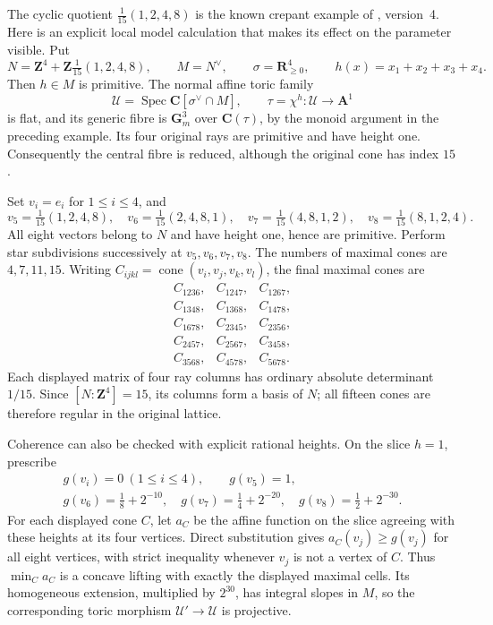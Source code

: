\begin{example}
\label{ex:fujiki-oka-height-one-model}
The cyclic quotient $\tfrac1{15}(1,2,4,8)$ is the known crepant
example of \cite[Example~3.10]{SS20FujikiV4}, version~4. Here is an
explicit local model calculation that makes its effect on the parameter
visible. Put
\[
 N=\mathbf Z^4+\mathbf Z\tfrac1{15}(1,2,4,8),\qquad
 M=N^\vee,\qquad \sigma=\mathbf R_{\geq0}^4,
 \qquad h(x)=x_1+x_2+x_3+x_4.
\]
Then $h\in M$ is primitive. The normal affine toric family
\[
 \mathcal U=\operatorname{Spec}\mathbf C[\sigma^\vee\cap M],
 \qquad \tau=\chi^h:\mathcal U\longrightarrow\mathbf A^1
\]
is flat, and its generic fibre is $\mathbf G_m^3$ over
$\mathbf C(\tau)$, by the monoid argument in the preceding example.
Its four original rays are primitive and have height one. Consequently
the central fibre is reduced, although the original cone has index $15$.

Set $v_i=e_i$ for $1\leq i\leq4$, and
\[
 v_5=\tfrac1{15}(1,2,4,8),\quad
 v_6=\tfrac1{15}(2,4,8,1),\quad
 v_7=\tfrac1{15}(4,8,1,2),\quad
 v_8=\tfrac1{15}(8,1,2,4).
\]
All eight vectors belong to $N$ and have height one, hence are
primitive. Perform star subdivisions successively at
$v_5,v_6,v_7,v_8$. The numbers of maximal cones are $4,7,11,15$.
Writing $C_{ijkl}=\operatorname{cone}(v_i,v_j,v_k,v_l)$, the final
maximal cones are
\[
\begin{array}{lll}
 C_{1236},&C_{1247},&C_{1267},\\
 C_{1348},&C_{1368},&C_{1478},\\
 C_{1678},&C_{2345},&C_{2356},\\
 C_{2457},&C_{2567},&C_{3458},\\
 C_{3568},&C_{4578},&C_{5678}.
\end{array}
\]
Each displayed matrix of four ray columns has ordinary absolute
determinant $1/15$. Since $[N:\mathbf Z^4]=15$, its columns form a
basis of $N$; all fifteen cones are therefore regular in the original
lattice.

Coherence can also be checked with explicit rational heights. On the
slice $h=1$, prescribe
\[
\begin{gathered}
 g(v_i)=0\ (1\leq i\leq4),\qquad g(v_5)=1,\\
 g(v_6)=\tfrac18+2^{-10},\quad
 g(v_7)=\tfrac14+2^{-20},\quad
 g(v_8)=\tfrac12+2^{-30}.
\end{gathered}
\]
For each displayed cone $C$, let $a_C$ be the affine function on the
slice agreeing with these heights at its four vertices. Direct
substitution gives $a_C(v_j)\geq g(v_j)$ for all eight vertices,
with strict inequality whenever $v_j$ is not a vertex of $C$.
Thus $\min_C a_C$ is a concave lifting with exactly the displayed
maximal cells. Its homogeneous extension, multiplied by $2^{30}$,
has integral slopes in $M$, so the corresponding toric morphism
$\mathcal U'\to\mathcal U$ is projective.


\end{example}
